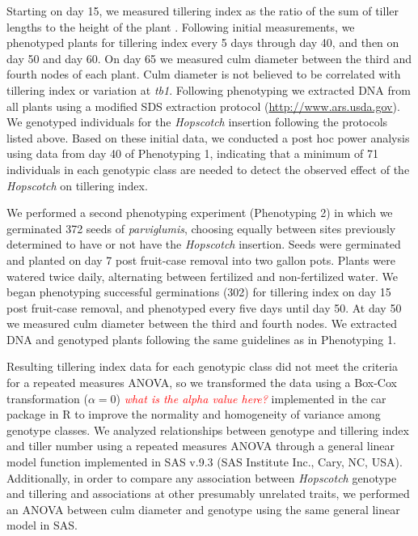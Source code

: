 \documentclass[11pt]{article}
\newcommand{\mbh}[1]{\textcolor{red}{ \emph{\scriptsize  #1}} }
\begin{document}
\begin{linenumbers}
\begin{flushleft}
Starting on day 15, we measured tillering index as the ratio of the sum of tiller lengths to the height of the plant \citep{Briggs2007}. Following initial measurements, we phenotyped plants for tillering index every 5 days through day 40, and then on day 50 and day 60. On day 65 we measured culm diameter between the third and fourth nodes of each plant. Culm diameter is not believed to be correlated with tillering index or variation at \emph{tb1}. Following phenotyping we extracted DNA from all plants using a modified SDS extraction protocol (\url{http://www.ars.usda.gov}). We genotyped individuals for the \emph{Hopscotch} insertion following the protocols listed above. Based on these initial data, we conducted a post hoc power analysis using data from day 40 of Phenotyping 1, indicating that a minimum of 71 individuals in each genotypic class are needed to detect the observed effect of the \emph{Hopscotch} on tillering index.

We performed a second phenotyping experiment (Phenotyping 2) in which we germinated 372 seeds of \emph{parviglumis}, choosing equally between sites previously determined to have or not have the \emph{Hopscotch} insertion. Seeds were germinated and planted on day 7 post fruit-case removal into two gallon pots. Plants were watered twice daily, alternating between fertilized and non-fertilized water. We began phenotyping successful germinations (302) for tillering index on day 15 post fruit-case removal, and phenotyped every five days until day 50. At day 50 we measured culm diameter between the third and fourth nodes. We extracted DNA and genotyped plants following the same guidelines as in Phenotyping 1. 

Resulting tillering index data for each genotypic class did not meet the criteria for a repeated measures ANOVA, so we transformed the data using a Box-Cox transformation ($\alpha=0$) \mbh{what is the alpha value here?} implemented in the car package in R \citep{FoxWeisberg2011} to improve the normality and homogeneity of variance among genotype classes.  We analyzed relationships between genotype and tillering index and tiller number using a repeated measures ANOVA through a general linear model function implemented in SAS v.9.3 (SAS Institute Inc., Cary, NC, USA). Additionally, in order to compare any association between \emph{Hopscotch} genotype and tillering and associations at other presumably unrelated traits, we performed an ANOVA between culm diameter and genotype using the same general linear model in SAS.


\end{flushleft}
\end{linenumbers}
\end{document}
